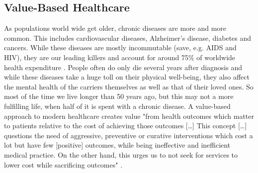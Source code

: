 \subsection{Value-Based Healthcare}
\label{sec:valueBasedHealthcare}


As populations world wide get older, chronic diseases are more and more common. This includes cardiovascular diseases, Alzheimer's disease, diabetes and cancers. While these diseases are mostly incommutable (save, e.g. AIDS and HIV), they are our leading killers and account for around 75\% of worldwide health expenditure \cite{tsiachristas2016financial}. People often do only die several years after diagnosis and while these diseases take a huge toll on their physical well-being, they also affect the mental health of the carriers themselves as well as that of their loved ones. So most of the time we live longer than 50 years ago, but this may not a more fulfilling life, when half of it is spent with a chronic disease. A value-based approach to modern healthcare creates value "from health outcomes which matter to patients relative to the cost of achieving those outcomes [\dots] This concept [\dots] questions the need of aggressive, preventive or curative interventions which cost a lot but have few [positive] outcomes, while being ineffective and inefficient medical practice. On the other hand, this urges us to not seek for services to lower cost while sacrificing outcomes" \cite{putera2017redefining}.
